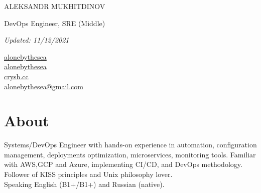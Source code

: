 \documentclass[11pt]{letter}
\newcommand{\forceindent}{\leavevmode{\parindent=1em\indent} %
}
\begin{document}
\begin{spacing}{2}
    {\centerline{{\huge \vphantom{Name}ALEKSANDR MUKHITDINOV}}}
    {\centerline{\large \vphantom{Position}DevOps Engineer, SRE (Middle)}}
    {\centerline{\textit{Updated: 11/12/2021}}}
\end{spacing}

{\setlength{\columnsep}{-0.9cm}\begin{multicols}{4}
    \begin{spacing}{2}\rmfamily
    \large{
        \vphantom{contacts}
        \faLinkedin \href{https://www.linkedin.com/in/alonebythesea}{\vphantom{LinkedIn} alonebythesea} \\
        \columnbreak
        \faGithubAlt \href{https://github.com/alonebythesea}{\vphantom{GitHub} alonebythesea} \\
        \columnbreak
        \faLink \href{https://crysh.cc}{\vphantom{Website} crysh.cc} \\
        \columnbreak
        \faEnvelope \href{mailto:alonebythesea@gmail.com}{\vphantom{Email} alonebythesea@gmail.com} \\
        \columnbreak
    }
  \end{spacing}\end{multicols}}

\section*{About\vphantom{about}}


\forceindent Systems/DevOps Engineer with hands-on experience in automation, configuration management, deployments optimization, microservices, monitoring tools. Familiar with AWS,GCP and Azure, implementing CI/CD, and DevOps methodology. Follower of KISS principles and Unix philosophy lover. \\


\forceindent Speaking English (B1+/B1+) and Russian (native).

\end{document}

